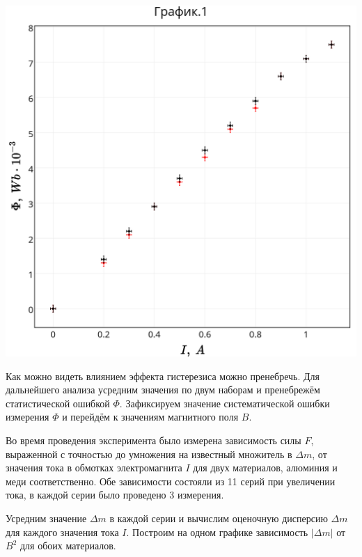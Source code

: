 \includegraphics[scale = 0.19]{my_plot1.png}

Как можно видеть влиянием эффекта гистерезиса можно пренебречь. Для дальнейшего анализа усредним значения по двум наборам и пренебрежём статистической ошибкой $\Phi$. Зафиксируем значение систематической ошибки измерения $\Phi$ и перейдём к значениям магнитного поля $B$.

Во время проведения эксперимента было измерена зависимость силы $F$, выраженной с точностью до умножения на известный множитель в $\Delta{m}$, от значения тока в обмотках электромагнита $I$ для двух материалов, алюминия и меди соответственно. Обе зависимости состояли из 11 серий при увеличении тока, в каждой серии было проведено 3 измерения. 

Усредним значение $\Delta{m}$ в каждой серии и вычислим оценочную дисперсию $\Delta{m}$ для каждого значения тока $I$. Построим на одном графике зависимость $|\Delta{m}|$ от $B^2$ для обоих материалов.

